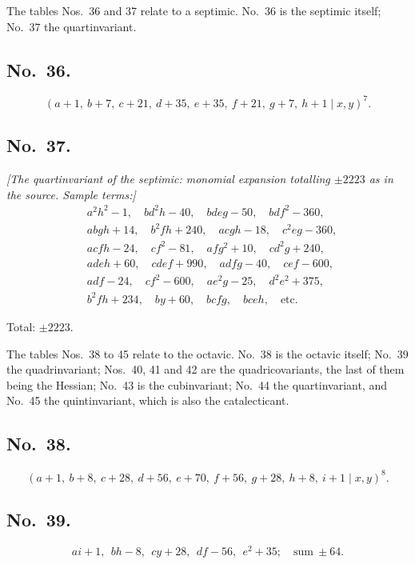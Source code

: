 \documentclass[11pt]{article}
\begin{document}
\bigskip

The tables Nos.\ 36 and 37 relate to a septimic. No.\ 36 is the septimic itself; No.\ 37 the quartinvariant.

\subsection*{No.\ 36.}
\[
(a+1,\ b+7,\ c+21,\ d+35,\ e+35,\ f+21,\ g+7,\ h+1 \mid x, y)^7.
\]

\subsection*{No.\ 37.}

\textit{[The quartinvariant of the septimic: monomial expansion totalling $\pm 2223$ as in the source. Sample terms:]}
\begin{align*}
& a^2 h^2 - 1, \quad bd^2 h - 40, \quad bdeg - 50, \quad bdf^2 - 360, \\
& abgh + 14, \quad b^2 fh + 240, \quad acgh - 18, \quad c^2 eg - 360, \\
& acfh - 24, \quad cf^2 - 81, \quad afg^2 + 10, \quad cd^2 g + 240, \\
& adeh + 60, \quad cdef + 990, \quad adfg - 40, \quad cef - 600, \\
& adf - 24, \quad cf^2 - 600, \quad ae^2 g - 25, \quad d^2 e^2 + 375, \\
& b^2 fh + 234, \quad by + 60, \quad bcfg, \quad bceh, \quad \text{etc.}
\end{align*}

Total: $\pm 2223$.

\bigskip

The tables Nos.\ 38 to 45 relate to the octavic. No.\ 38 is the octavic itself; No.\ 39 the quadrinvariant; Nos.\ 40, 41 and 42 are the quadricovariants, the last of them being the Hessian; No.\ 43 is the cubinvariant; No.\ 44 the quartinvariant, and No.\ 45 the quintinvariant, which is also the catalecticant.

\subsection*{No.\ 38.}
\[
(a + 1,\ b + 8,\ c + 28,\ d + 56,\ e + 70,\ f + 56,\ g + 28,\ h + 8,\ i + 1 \mid x, y)^8.
\]

\subsection*{No.\ 39.}
\[
ai + 1,\ \ bh - 8,\ \ cy + 28,\ \ df - 56,\ \ e^2 + 35; \quad\text{sum}\ \pm 64.
\]
\end{document}
